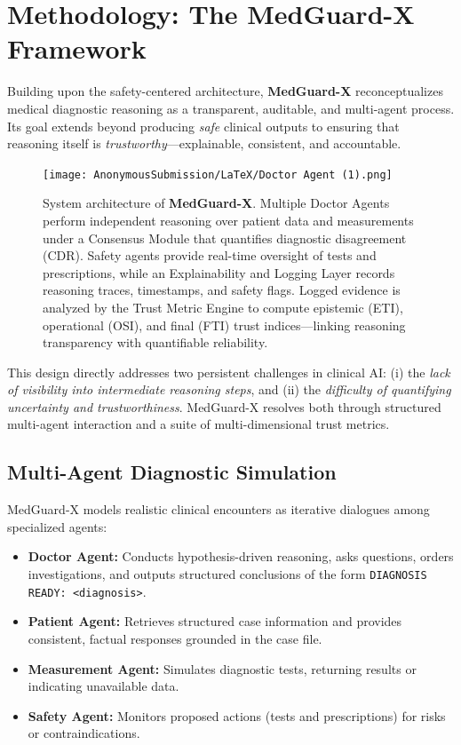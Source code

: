 \documentclass[letterpaper]{article} %
\begin{document}
\section{Methodology: The MedGuard-X Framework}

Building upon the safety-centered architecture, \textbf{MedGuard-X} reconceptualizes medical diagnostic reasoning as a transparent, auditable, and multi-agent process. Its goal extends beyond producing \textit{safe} clinical outputs to ensuring that reasoning itself is \textit{trustworthy}—explainable, consistent, and accountable.

\begin{figure}[t]
\centering
\texttt{[image: AnonymousSubmission/LaTeX/Doctor Agent (1).png]}
\caption{
System architecture of \textbf{MedGuard-X}. Multiple Doctor Agents perform independent reasoning over patient data and measurements under a Consensus Module that quantifies diagnostic disagreement (CDR). Safety agents provide real-time oversight of tests and prescriptions, while an Explainability and Logging Layer records reasoning traces, timestamps, and safety flags. Logged evidence is analyzed by the Trust Metric Engine to compute epistemic (ETI), operational (OSI), and final (FTI) trust indices—linking reasoning transparency with quantifiable reliability.
}
\label{fig:logging-architecture}
\end{figure}

This design directly addresses two persistent challenges in clinical AI: (i) the \textit{lack of visibility into intermediate reasoning steps}, and (ii) the \textit{difficulty of quantifying uncertainty and trustworthiness}. MedGuard-X resolves both through structured multi-agent interaction and a suite of multi-dimensional trust metrics.

\subsection{Multi-Agent Diagnostic Simulation}

MedGuard-X models realistic clinical encounters as iterative dialogues among specialized agents:

\begin{itemize}
    \item \textbf{Doctor Agent:} Conducts hypothesis-driven reasoning, asks questions, orders investigations, and outputs structured conclusions of the form \texttt{DIAGNOSIS READY: <diagnosis>}.
    \item \textbf{Patient Agent:} Retrieves structured case information and provides consistent, factual responses grounded in the case file.
    \item \textbf{Measurement Agent:} Simulates diagnostic tests, returning results or indicating unavailable data.
    \item \textbf{Safety Agent:} Monitors proposed actions (tests and prescriptions) for risks or contraindications.
\end{itemize}
\end{document}
